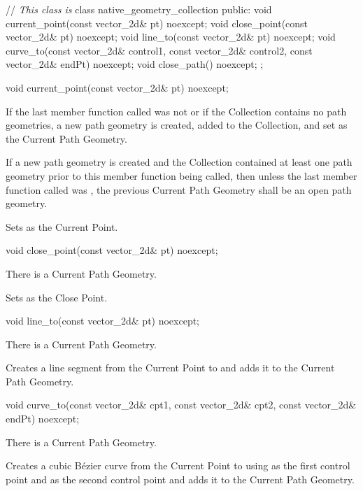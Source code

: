 \begin{codeblock}
// \textit{This class is }\expos
class native_geometry_collection {
public:
  void current_point(const vector_2d& pt) noexcept;
  void close_point(const vector_2d& pt) noexcept;
  void line_to(const vector_2d& pt) noexcept;
  void curve_to(const vector_2d& control1, const vector_2d& control2,
    const vector_2d& endPt) noexcept;
  void close_path() noexcept;
};
\end{codeblock}

\begin{itemdecl}
  void current_point(const vector_2d& pt) noexcept;
\end{itemdecl}
\begin{itemdescr}
	\pnum
	\effects
	If the last member function called was not  or if the Collection contains no path geometries, a new path geometry is created, added to the Collection, and set as the Current Path Geometry.
	
	\pnum
	If a new path geometry is created and the Collection contained at least one path geometry prior to this member function being called, then unless the last member function called was , the previous Current Path Geometry shall be an open path geometry.
	
	\pnum
	Sets  as the Current Point.
\end{itemdescr}

\begin{itemdecl}
  void close_point(const vector_2d& pt) noexcept;
\end{itemdecl}
\begin{itemdescr}
	\pnum
	\preconditions
	There is a Current Path Geometry.
	
	\pnum
	\effects
	Sets  as the Close Point.

\end{itemdescr}

\begin{itemdecl}
  void line_to(const vector_2d& pt) noexcept;
\end{itemdecl}
\begin{itemdescr}
	\pnum
	\preconditions
	There is a Current Path Geometry.
	
	\pnum
	\effects
	Creates a line segment from the Current Point to  and adds it to the Current Path Geometry.

\end{itemdescr}

\begin{itemdecl}
  void curve_to(const vector_2d& cpt1, const vector_2d& cpt2,
    const vector_2d& endPt) noexcept;
\end{itemdecl}
\begin{itemdescr}
	\pnum
	\preconditions
	There is a Current Path Geometry.
	
	\pnum
	\effects
	Creates a cubic B\'ezier curve from the Current Point to  using  as the first control point and  as the second control point and adds it to the Current Path Geometry.

\end{itemdescr}

